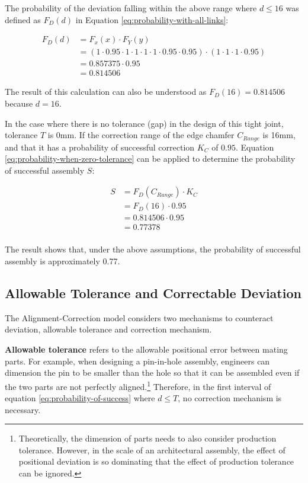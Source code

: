 The probability of the deviation falling within the above range where $d \le 16$ was defined as $F_D(d)$ in Equation \ref{eq:probability-with-all-links}:

\begingroup\abovedisplayskip=-5pt \belowdisplayskip=10pt
\begin{align}
    F_D(d) &= F_x(x) \cdot F_Y(y) \nonumber\\
      &= (1 \cdot 0.95 \cdot 1 \cdot 1 \cdot 1 \cdot 1 \cdot 0.95 \cdot 0.95) \cdot (1 \cdot 1 \cdot 1 \cdot 0.95)\nonumber\\
      &= 0.857375 \cdot 0.95\nonumber\\
      &= 0.814506\nonumber
\end{align}
\endgroup

The result of this calculation can also be understood as $F_D(16) = 0.814506$ because $d = 16$.

In the case where there is no tolerance (gap) in the design of this tight joint, tolerance $T$ is 0mm. If the correction range of the edge chamfer $C_{Range}$ is 16mm, and that it has a probability of successful correction $K_C$ of $0.95$. Equation \ref{eq:probability-when-zero-tolerance} can be applied to determine the probability of successful assembly $S$:

\begingroup\abovedisplayskip=-5pt \belowdisplayskip=10pt
\begin{align}
    S &= F_D(C_{Range}) \cdot K_C \nonumber\\
      &= F_D(16) \cdot 0.95 \nonumber\\
      &=  0.814506 \cdot 0.95 \nonumber\\
      &= 0.77378 \nonumber\\
\end{align}
\endgroup

The result shows that, under the above assumptions, the probability of successful assembly is approximately 0.77.


\subsection{Allowable Tolerance and Correctable Deviation}
\label{subsection:new-hypo-allowable-tolerance-and-correctable-deviation}

The Alignment-Correction model considers two mechanisms to counteract deviation, allowable tolerance and correction mechanism.

\textbf{Allowable tolerance} refers to the allowable positional error between mating parts. For example, when designing a pin-in-hole assembly, engineers can dimension the pin to be smaller than the hole so that it can be assembled even if the two parts are not perfectly aligned.\footnote{Theoretically, the dimension of parts needs to also consider production tolerance. However, in the scale of an architectural assembly, the effect of positional deviation is so dominating that the effect of production tolerance can be ignored.} Therefore, in the first interval of equation \ref{eq:probability-of-success} where $ d \leq T$, no correction mechanism is necessary.

